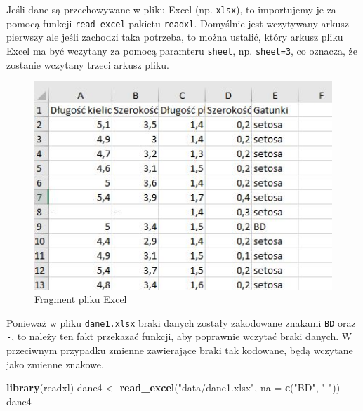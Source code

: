 \documentclass[
]{book}
\newenvironment{Shaded}{\begin{snugshade}}{\end{snugshade}}
\newcommand{\DataTypeTok}[1]{\textcolor[rgb]{0.13,0.29,0.53}{#1}}
\newcommand{\KeywordTok}[1]{\textcolor[rgb]{0.13,0.29,0.53}{\textbf{#1}}}
\newcommand{\NormalTok}[1]{#1}
\newcommand{\StringTok}[1]{\textcolor[rgb]{0.31,0.60,0.02}{#1}}
\theoremstyle{plain}
\theoremstyle{definition}
\theoremstyle{definition}
\theoremstyle{definition}
\theoremstyle{definition}
\theoremstyle{remark}
\begin{document}
Jeśli dane są przechowywane w pliku Excel (np. \texttt{xlsx}), to importujemy je za pomocą funkcji \texttt{read\_excel} pakietu \texttt{readxl}. Domyślnie jest wczytywany arkusz pierwszy ale jeśli zachodzi taka potrzeba, to można ustalić, który arkusz pliku Excel ma być wczytany za pomocą paramteru \texttt{sheet}, np. \texttt{sheet=3}, co oznacza, że zostanie wczytany trzeci arkusz pliku.

\begin{figure}
\includegraphics[width=5.68in]{images/excel} \caption{Fragment pliku Excel}\label{fig:excel}
\end{figure}

Ponieważ w pliku \texttt{dane1.xlsx} braki danych zostały zakodowane znakami \texttt{BD} oraz \texttt{-}, to należy ten fakt przekazać funkcji, aby poprawnie wczytać braki danych. W przeciwnym przypadku zmienne zawierające braki tak kodowane, będą wczytane jako zmienne znakowe.

\begin{Shaded}
\begin{Highlighting}[]
\KeywordTok{library}\NormalTok{(readxl)}
\NormalTok{dane4 <-}\StringTok{ }\KeywordTok{read_excel}\NormalTok{(}\StringTok{"data/dane1.xlsx"}\NormalTok{, }\DataTypeTok{na =} \KeywordTok{c}\NormalTok{(}\StringTok{"BD"}\NormalTok{, }\StringTok{"-"}\NormalTok{))}
\NormalTok{dane4}
\end{Highlighting}
\end{Shaded}
\end{document}
